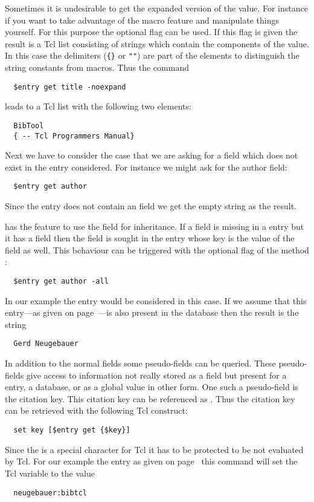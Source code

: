 Sometimes it is undesirable to get the expanded version of the value.
For instance if you want to take advantage of the \BibTeX{} macro
feature and manipulate things yourself. For this purpose the optional
flag  can be used. If this flag is given the result is
a Tcl list consisting of strings which contain the components of the
value.  In this case the delimiters (\verb|{}| or \verb|""|) are part
of the elements to distinguish the string constants from macros. Thus
the command 
\begin{verbatim}
  $entry get title -noexpand
\end{verbatim}%
\noindent
leads to a Tcl list with the following two elements:
\begin{verbatim}
  BibTool
  { -- Tcl Programmers Manual}
\end{verbatim}

Next we have to consider the case that we are asking for a field
which does not exist in the entry considered. For instance we might
ask for the author field:
\begin{verbatim}
  $entry get author
\end{verbatim}%
Since the entry does not contain an  field we get the
empty string as the result. 

\BibTeX{} has the feature to use the  field for
inheritance. If a field is missing in a entry but it has a
 field then the field is sought in the entry whose key
is the value of the  field as well.
This behaviour can be triggered with the optional flag  of
the method :
\begin{verbatim}
  $entry get author -all
\end{verbatim}%
In our example the entry  would be
considered in this case. If we assume that this entry---as given on
page~\pageref{example:bibtool}---is also present in the database then the
result is the string
\begin{verbatim}
  Gerd Neugebauer
\end{verbatim}

In addition to the normal fields some pseudo-fields can be queried.
These pseudo-fields give access to information not really stored as a
field but present for a entry, a database, or as a global value in
other form. One such a pseudo-field is the citation key. This citation
key can be referenced as . Thus the citation key can be
retrieved with the following Tcl construct:
\begin{verbatim}
  set key [$entry get {$key}]
\end{verbatim}
Since the \code{\$} is a special character for Tcl it has to be
protected to be not evaluated by Tcl.
For our example the entry as given on page~\pageref{example:bibtool}
this command will set the Tcl variable  to the value
\begin{verbatim}
  neugebauer:bibtcl
\end{verbatim}

